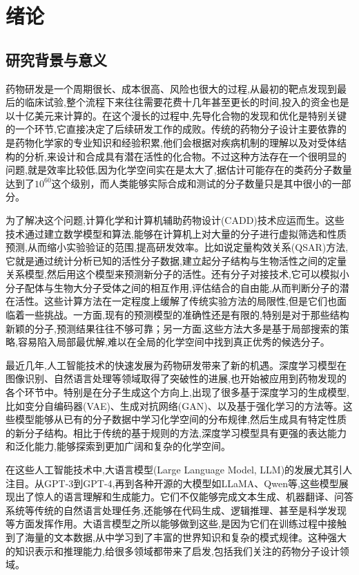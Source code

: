 \chapter{绪论}
\vspace{7pt}


\section{研究背景与意义}

药物研发是一个周期很长、成本很高、风险也很大的过程,从最初的靶点发现到最后的临床试验,整个流程下来往往需要花费十几年甚至更长的时间,投入的资金也是以十亿美元来计算的\cite{di2019innovation}。在这个漫长的过程中,先导化合物的发现和优化是特别关键的一个环节,它直接决定了后续研发工作的成败。传统的药物分子设计主要依靠的是药物化学家的专业知识和经验积累,他们会根据对疾病机制的理解以及对受体结构的分析,来设计和合成具有潜在活性的化合物。不过这种方法存在一个很明显的问题,就是效率比较低,因为化学空间实在是太大了,据估计可能存在的类药分子数量达到了$10^{60}$这个级别\cite{bohacek1996art}，而人类能够实际合成和测试的分子数量只是其中很小的一部分。

为了解决这个问题,计算化学和计算机辅助药物设计(CADD)技术应运而生。这些技术通过建立数学模型和算法,能够在计算机上对大量的分子进行虚拟筛选和性质预测,从而缩小实验验证的范围,提高研发效率\cite{lyu2019ultra}。比如说定量构效关系(QSAR)方法,它就是通过统计分析已知的活性分子数据,建立起分子结构与生物活性之间的定量关系模型,然后用这个模型来预测新分子的活性\cite{muratov2020qsar}。还有分子对接技术,它可以模拟小分子配体与生物大分子受体之间的相互作用,评估结合的自由能,从而判断分子的潜在活性\cite{meng2011molecular}。这些计算方法在一定程度上缓解了传统实验方法的局限性,但是它们也面临着一些挑战。一方面,现有的预测模型的准确性还是有限的,特别是对于那些结构新颖的分子,预测结果往往不够可靠；另一方面,这些方法大多是基于局部搜索的策略,容易陷入局部最优解,难以在全局的化学空间中找到真正优秀的候选分子。

最近几年,人工智能技术的快速发展为药物研发带来了新的机遇。深度学习模型在图像识别、自然语言处理等领域取得了突破性的进展,也开始被应用到药物发现的各个环节中\cite{chen2018rise}。特别是在分子生成这个方向上,出现了很多基于深度学习的生成模型,比如变分自编码器(VAE)、生成对抗网络(GAN)、以及基于强化学习的方法等\cite{olivecrona2017molecular}。这些模型能够从已有的分子数据中学习化学空间的分布规律,然后生成具有特定性质的新分子结构。相比于传统的基于规则的方法,深度学习模型具有更强的表达能力和泛化能力,能够探索到更加广阔和复杂的化学空间。

在这些人工智能技术中,大语言模型(Large Language Model, LLM)的发展尤其引人注目。从GPT-3到GPT-4,再到各种开源的大模型如LLaMA\cite{touvron2023llama}、Qwen等,这些模型展现出了惊人的语言理解和生成能力\cite{achiam2023gpt}。它们不仅能够完成文本生成、机器翻译、问答系统等传统的自然语言处理任务,还能够在代码生成、逻辑推理、甚至是科学发现等方面发挥作用。大语言模型之所以能够做到这些,是因为它们在训练过程中接触到了海量的文本数据,从中学习到了丰富的世界知识和复杂的模式规律。这种强大的知识表示和推理能力,给很多领域都带来了启发,包括我们关注的药物分子设计领域。

